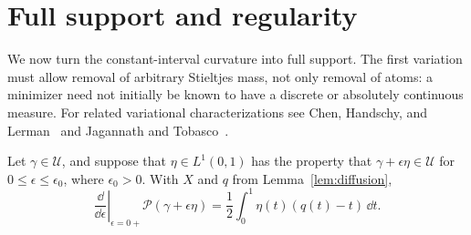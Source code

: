 \section{Full support and regularity}
\label{sec:variation}

We now turn the constant-interval curvature into full support.
The first variation must allow removal of arbitrary Stieltjes mass,
not only removal of atoms: a minimizer need not initially be known
to have a discrete or absolutely continuous measure.
For related variational characterizations see
Chen, Handschy, and Lerman~\cite[Propositions~3--4]{CHL2018} and
Jagannath and Tobasco~\cite[Lemma~3.2 and Corollary~3.6]{JT2017}.

\begin{lemma}
\label{lem:first-variation}
Let $\gamma\in\mathcal U$, and suppose that $\eta\in L^1(0,1)$
has the property that $\gamma+\epsilon\eta\in\mathcal U$ for
$0\leq\epsilon\leq\epsilon_0$, where $\epsilon_0>0$.
With $X$ and $q$ from Lemma~\ref{lem:diffusion},
\begin{equation}
 \left.\frac{\dd}{\dd\epsilon}\right|_{\epsilon=0+}
       \mathcal P(\gamma+\epsilon\eta)
   =\frac12\int_0^1\eta(t)(q(t)-t)\,\dd t.
 \label{eq:first-variation}
\end{equation}
\end{lemma}

